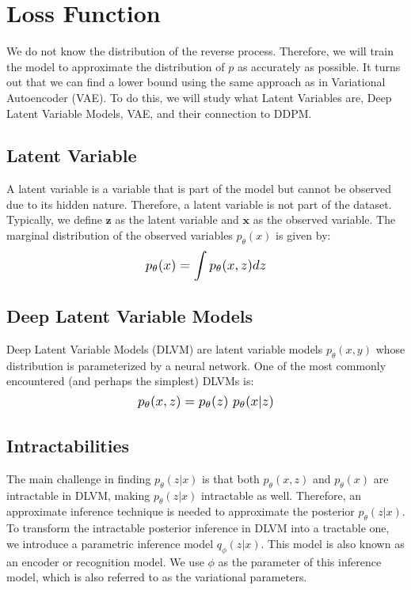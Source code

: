 \documentclass{article}
\newcommand*{\Scale}[2][4]{\scalebox{#1}{\ensuremath{#2}}}
\begin{document}
\section{Loss Function}


We do not know the distribution of the reverse process. Therefore, we will train the model to approximate the distribution of $ p $ as accurately as possible. It turns out that we can find a lower bound using the same approach as in Variational Autoencoder (VAE). To do this, we will study what Latent Variables are, Deep Latent Variable Models, VAE, and their connection to DDPM.


\subsection{Latent Variable}


A latent variable is a variable that is part of the model but cannot be observed due to its hidden nature. Therefore, a latent variable is not part of the dataset. Typically, we define $ \textbf{z} $ as the latent variable and $ \textbf{x} $  as the observed variable. The marginal distribution of the observed variables $ p_\theta(x) $ is given by:
\begin{equation}
\Scale[1.2]{\displaystyle p_\theta(x) = \int p_\theta(x,z) dz }
\end{equation}


\subsection{Deep Latent Variable Models}


Deep Latent Variable Models (DLVM) are latent variable models $ p_\theta(x,y) $ whose distribution is parameterized by a neural network. One of the most commonly encountered (and perhaps the simplest) DLVMs is:
\begin{equation}
\Scale[1.2]{ p_\theta(x,z) = p_\theta(z) \ p_\theta(x|z) }
\end{equation}


\subsection{Intractabilities}


The main challenge in finding $ p_\theta(z|x) $ is that both $ p_\theta(x, z) $ and $ p_\theta(x) $ are intractable in DLVM, making $ p_\theta(z|x) $ intractable as well. Therefore, an approximate inference technique is needed to approximate the posterior $ p_\theta(z|x) $. To transform the intractable posterior inference in DLVM into a tractable one, we introduce a parametric inference model $ q_\phi(z|x) $. This model is also known as an encoder or recognition model. We use $ \phi $ as the parameter of this inference model, which is also referred to as the variational parameters. 
\end{document}
